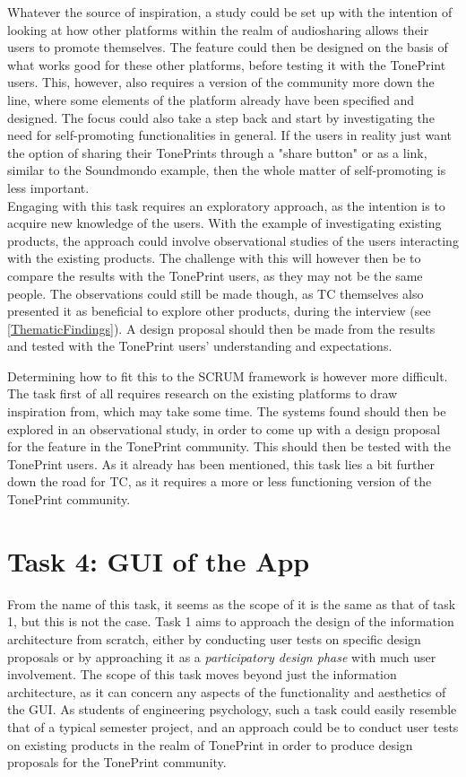 Whatever the source of inspiration, a study could be set up with the intention of looking at how other platforms within the realm of audiosharing allows their users to promote themselves. The feature could then be designed on the basis of what works good for these other platforms, before testing it with the TonePrint users. This, however, also requires a version of the community more down the line, where some elements of the platform already have been specified and designed. The focus could also take a step back and start by investigating the need for self-promoting functionalities in general. If the users in reality just want the option of sharing their TonePrints through a "share button" or as a link, similar to the Soundmondo example, then the whole matter of self-promoting is less important.\\

\noindent
Engaging with this task requires an exploratory approach, as the intention is to acquire new knowledge of the users. With the example of investigating existing products, the approach could involve observational studies of the users interacting with the existing products. The challenge with this will however then be to compare the results with the TonePrint users, as they may not be the same people. The observations could still be made though, as TC themselves also presented it as beneficial to explore other products, during the interview (see \autoref{ThematicFindings}). A design proposal should then be made from the results and tested with the TonePrint users' understanding and expectations.

Determining how to fit this to the SCRUM framework is however more difficult. The task first of all requires research on the existing platforms to draw inspiration from, which may take some time. The systems found should then be explored in an observational study, in order to come up with a design proposal for the feature in the TonePrint community. This should then be tested with the TonePrint users. As it already has been mentioned, this task lies a bit further down the road for TC, as it requires a more or less functioning version of the TonePrint community.

\section{Task 4: GUI of the App}
\label{Task4}
From the name of this task, it seems as the scope of it is the same as that of task 1, but this is not the case. Task 1 aims to approach the design of the information architecture from scratch, either by conducting user tests on specific design proposals or by approaching it as a \textit{participatory design phase} with much user involvement. The scope of this task moves beyond just the information architecture, as it can concern any aspects of the functionality and aesthetics of the GUI. As students of engineering psychology, such a task could easily resemble that of a typical semester project, and an approach could be to conduct user tests on existing products in the realm of TonePrint in order to produce design proposals for the TonePrint community.\\

